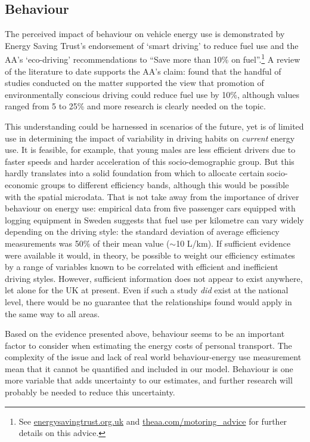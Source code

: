 \subsection{Behaviour}
The perceived impact of behaviour on vehicle energy use is demonstrated
by Energy Saving Trust's endorsement of `smart driving' to reduce fuel use
 and the AA's `eco-driving' recommendations to ``Save more than 10\% on
 fuel''.\footnote{See
 \href{http://www.energysavingtrust.org.uk/Travel/Driving}{energysavingtrust.org.uk}
and \href{http://www.theaa.com/motoring_advice/fuels-and-environment/drive-smart.html}
{theaa.com/motoring\_advice}
for further details on this advice.
}
A review of the literature to date supports the AA's claim:
\citet{Barkenbus2010} found that the handful of studies conducted
on the matter supported the view that promotion of environmentally conscious
driving could reduce fuel use by 10\%, although values ranged from 5 to 25\%
and more research is clearly needed on the topic.

This understanding could be harnessed in scenarios of the future, yet is of limited
use in determining the impact of variability in driving habits on \emph{current}
energy use. It is feasible, for example, that young males are less efficient drivers
due to faster speeds \citep{fleiter2007choosing} and harder acceleration
of this socio-demographic group. But this hardly translates into a
solid foundation from which to allocate certain socio-economic groups
to different efficiency bands, although this would be possible with the
spatial microdata. That is not take away from the importance of driver
behaviour on energy use: 
empirical data from five passenger cars equipped with
logging equipment in Sweden \citep{Ericsson2001a} suggests that
fuel use per kilometre can vary widely depending on the driving style:
the standard deviation of average efficiency measurements was 50\%
of their mean value ($\sim$10 L/km). If sufficient evidence were available
it would, in theory, be possible to weight our efficiency estimates
by a range of variables known to be correlated with efficient and
inefficient driving styles. However, sufficient information does
not appear to exist anywhere, let alone for the UK at present.
Even if such a study \emph{did} exist at the national level,
there would be no guarantee that the relationships found would apply in the
same way to all areas.

Based on the evidence presented above, behaviour seems to be an important factor
to consider when estimating the energy costs of personal transport.
The complexity of the issue and lack of real world behaviour-energy use
measurement mean that it cannot be quantified and included in our model.
Behaviour is one more variable that adds uncertainty to our estimates,
and further research will probably be needed to reduce this uncertainty.

